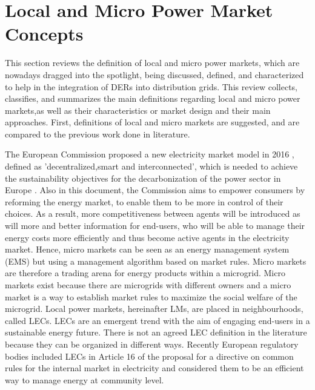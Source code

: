 \section{Local and Micro Power Market Concepts} \label{sec:localmicroconcepts}
This section reviews the definition of local and micro power markets, which are nowadays dragged into the spotlight, being discussed, defined, and characterized to help in the integration of DERs into distribution grids. This review collects, classifies, and summarizes the main definitions regarding local and micro power markets,as well as their characteristics or market design and their main approaches. First, definitions of local and micro markets are suggested, and are compared to the previous work done in literature.

The European Commission proposed a new electricity market model in 2016 \cite{validzic2017clean}, defined as 'decentralized,smart and interconnected', which is needed to achieve the sustainability objectives for the decarbonization of the power sector in Europe \cite{peng2017electricity}. Also in this document, the Commission aims to empower consumers by reforming the energy market, to enable them to be more in control of their choices. As a result, more competitiveness between agents will be introduced as will more and better information for end-users, who will be able to manage their energy costs more efficiently and thus become active agents in the electricity market.
Hence, micro markets can be seen as an energy management system (EMS) but using a management algorithm based on market rules. Micro markets are therefore a trading arena for energy products within a microgrid. Micro markets exist because there are microgrids with different owners and a micro market is a way to establish market rules to maximize the social welfare of the microgrid.
Local power markets, hereinafter LMs, are placed in neighbourhoods, called LECs. LECs are an emergent trend with the aim of engaging end-users in a sustainable energy future. There is not an agreed LEC definition in the literature because they can be organized in different ways. Recently European regulatory bodies included LECs in Article 16 of the proposal for a directive on common rules for the internal market in electricity \cite{validzic2017clean} and considered them to be an efficient way to manage energy at community level. 
